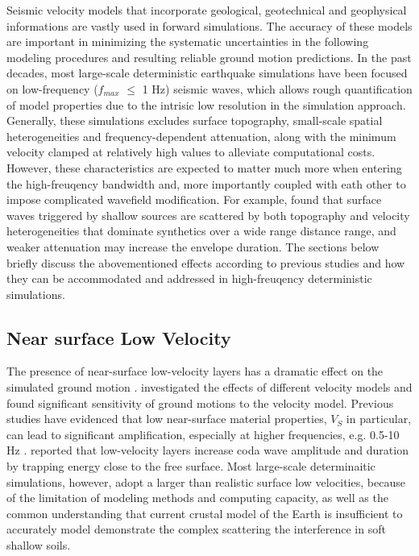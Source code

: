 Seismic velocity models that incorporate geological, geotechnical and geophysical informations are vastly used in forward simulations. The accuracy of these models are important in minimizing the systematic uncertainties in the following modeling procedures and resulting reliable ground motion predictions. In the past decades, most large-scale deterministic earthquake simulations have been focused on low-frequency ($f_{max}$ $\leqslant$ 1 Hz) seismic waves, which allows rough quantification of model properties due to the intrisic low resolution in the simulation approach. Generally, these simulations excludes surface topography, small-scale spatial heterogeneities and frequency-dependent attenuation, along with the minimum velocity clamped at relatively high values to alleviate computational costs. However, these characteristics are expected to matter much more when entering the high-freuqency bandwidth and, more importantly coupled with eath other to impose complicated wavefield modification. For example, \citet{laiShallowBasinStructure2020} found that surface waves triggered by shallow sources are scattered by both topography and velocity heterogeneities that dominate synthetics over a wide range distance range, and weaker attenuation may increase the envelope duration.
The sections below briefly discuss the abovementioned effects according to previous studies and how they can be accommodated and addressed in high-freuqency deterministic simulations.


\subsection{Near surface Low Velocity}
The presence of near-surface low-velocity layers has a dramatic effect on the simulated ground motion \citep{imperatoriRoleTopographyLateral2015}.
\citet{shawUnifiedStructuralRepresentation2015} investigated the effects of different velocity models and found significant sensitivity of ground motions to the velocity model. Previous studies have evidenced that low near-surface material properties, $V_S$ in particular, can lead to significant amplification, especially at higher frequencies, e.g. 0.5-10 Hz \citep{booreSiteAmplificationsGeneric1997,poggiDerivationReferenceShearWave2011}. \citet{imperatoriBroadbandNearfieldGround2013} reported that low-velocity layers increase coda wave amplitude and duration by trapping energy close to the free surface.
Most large-scale determinaitic simulations, however, adopt a larger than realistic surface low velocities, because of the limitation of modeling methods and computing capacity, as well as the common understanding that current crustal model of the Earth is insufficient to accurately model demonstrate the complex scattering the interference in soft shallow soils.

